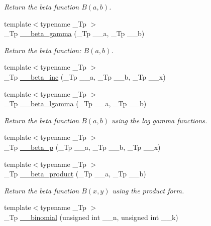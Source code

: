 \begin{DoxyCompactItemize}
\begin{DoxyCompactList}\small\item\em Return the beta function $ B(a,b) $. \end{DoxyCompactList}\item 
{\footnotesize template$<$typename \+\_\+\+Tp $>$ }\\\+\_\+\+Tp \hyperlink{namespacestd_1_1____detail_a93cfa67cc3f14564925ed3153e055cd1}{\+\_\+\+\_\+beta\+\_\+gamma} (\+\_\+\+Tp \+\_\+\+\_\+a, \+\_\+\+Tp \+\_\+\+\_\+b)
\begin{DoxyCompactList}\small\item\em Return the beta function\+: $ B(a,b) $. \end{DoxyCompactList}\item 
{\footnotesize template$<$typename \+\_\+\+Tp $>$ }\\\+\_\+\+Tp \hyperlink{namespacestd_1_1____detail_aedfe43a9c0065cc3883df50536a625e4}{\+\_\+\+\_\+beta\+\_\+inc} (\+\_\+\+Tp \+\_\+\+\_\+a, \+\_\+\+Tp \+\_\+\+\_\+b, \+\_\+\+Tp \+\_\+\+\_\+x)
\item 
{\footnotesize template$<$typename \+\_\+\+Tp $>$ }\\\+\_\+\+Tp \hyperlink{namespacestd_1_1____detail_ac4f233100713779d93e4eee7665bd0a5}{\+\_\+\+\_\+beta\+\_\+lgamma} (\+\_\+\+Tp \+\_\+\+\_\+a, \+\_\+\+Tp \+\_\+\+\_\+b)
\begin{DoxyCompactList}\small\item\em Return the beta function $B(a,b)$ using the log gamma functions. \end{DoxyCompactList}\item 
{\footnotesize template$<$typename \+\_\+\+Tp $>$ }\\\+\_\+\+Tp \hyperlink{namespacestd_1_1____detail_ae1ebc99ce7ff6bf261b519ab293f4fd6}{\+\_\+\+\_\+beta\+\_\+p} (\+\_\+\+Tp \+\_\+\+\_\+a, \+\_\+\+Tp \+\_\+\+\_\+b, \+\_\+\+Tp \+\_\+\+\_\+x)
\item 
{\footnotesize template$<$typename \+\_\+\+Tp $>$ }\\\+\_\+\+Tp \hyperlink{namespacestd_1_1____detail_a9baa688a27befab7fa48ccfb4a87a9ca}{\+\_\+\+\_\+beta\+\_\+product} (\+\_\+\+Tp \+\_\+\+\_\+a, \+\_\+\+Tp \+\_\+\+\_\+b)
\begin{DoxyCompactList}\small\item\em Return the beta function $B(x,y)$ using the product form. \end{DoxyCompactList}\item 
{\footnotesize template$<$typename \+\_\+\+Tp $>$ }\\\+\_\+\+Tp \hyperlink{namespacestd_1_1____detail_a4483574682ad034be17c75ef29892b02}{\+\_\+\+\_\+binomial} (unsigned int \+\_\+\+\_\+n, unsigned int \+\_\+\+\_\+k)

\end{DoxyCompactItemize}

